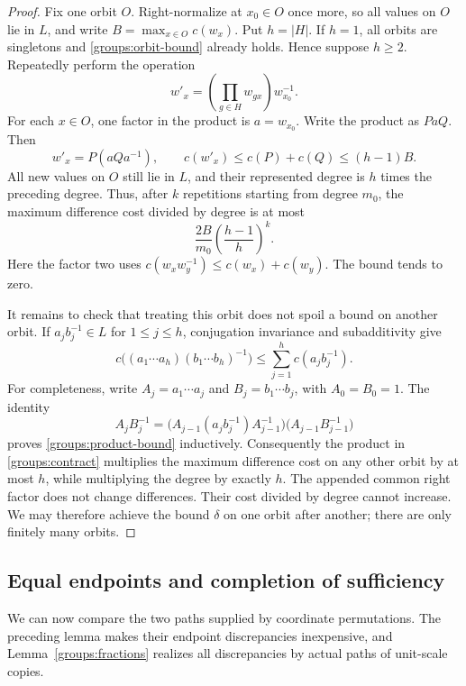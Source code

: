 \begin{proof}
Fix one orbit $O$.  Right-normalize at $x_0\in O$ once more, so all
values on $O$ lie in $L$, and write
$B=\max_{x\in O}c(w_x)$.  Put $h=|H|$.
If $h=1$, all orbits are singletons and \eqref{groups:orbit-bound}
already holds.  Hence suppose $h\ge2$.
Repeatedly perform the operation
\begin{equation}\label{groups:contract}
 w'_x=\left(\prod_{g\in H}w_{g x}\right)w_{x_0}^{-1}.
\end{equation}
For each $x\in O$, one factor in the product is $a=w_{x_0}$.
Write the product as $P a Q$.  Then
\[
 w'_x=P(aQa^{-1}),\qquad
 c(w'_x)\le c(P)+c(Q)\le(h-1)B.
\]
All new values on $O$ still lie in $L$, and their represented degree is
$h$ times the preceding degree.  Thus, after $k$ repetitions starting
from degree $m_0$, the maximum difference cost divided by degree is at
most
\begin{equation}\label{groups:contraction-rate}
 \frac{2B}{m_0}\left(\frac{h-1}{h}\right)^k.
\end{equation}
Here the factor two uses
$c(w_xw_y^{-1})\le c(w_x)+c(w_y)$.
The bound tends to zero.

It remains to check that treating this orbit does not spoil a bound on
another orbit.  If $a_jb_j^{-1}\in L$ for $1\le j\le h$, conjugation
invariance and subadditivity give
\begin{equation}\label{groups:product-bound}
 c\bigl((a_1\cdots a_h)(b_1\cdots b_h)^{-1}\bigr)
 \le\sum_{j=1}^h c(a_jb_j^{-1}).
\end{equation}
For completeness, write $A_j=a_1\cdots a_j$ and
$B_j=b_1\cdots b_j$, with $A_0=B_0=1$.  The identity
\[
 A_jB_j^{-1}
 =\bigl(A_{j-1}(a_jb_j^{-1})A_{j-1}^{-1}\bigr)
   \bigl(A_{j-1}B_{j-1}^{-1}\bigr)
\]
proves \eqref{groups:product-bound} inductively.
Consequently the product in \eqref{groups:contract} multiplies the
maximum difference cost on any other orbit by at most $h$, while
multiplying the degree by exactly $h$.  The appended common right factor
does not change differences.  Their cost divided by degree cannot
increase.  We may therefore achieve the bound $\delta$ on one orbit
after another; there are only finitely many orbits.
\end{proof}

\subsection{Equal endpoints and completion of sufficiency}

We can now compare the two paths supplied by coordinate permutations.
The preceding lemma makes their endpoint discrepancies inexpensive,
and Lemma~\ref{groups:fractions} realizes all discrepancies by actual
paths of unit-scale copies.

